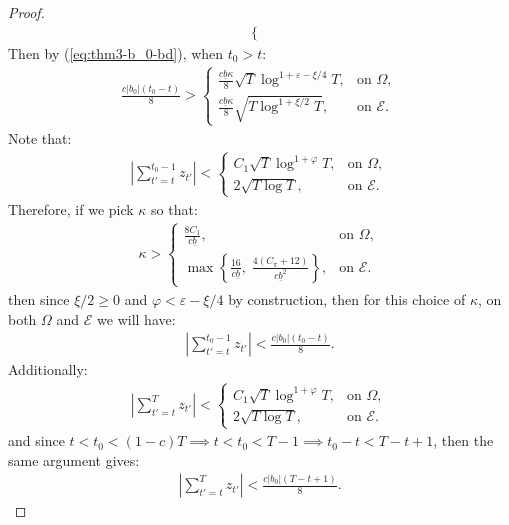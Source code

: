 \begin{proof}
\begin{align*}
\begin{cases}
    \end{cases}
\end{align*}
Then by (\ref{eq:thm3-b_0-bd}), when $t_0 > t$:
\begin{align*}
    \frac{c|b_0|(t_0-t)}{8} > 
    \begin{cases}
        \frac{c\underline{b}\kappa}{8} \sqrt{T}\log^{1+\varepsilon - \xi/4} T, & \text{on } \Omega, \\
        \frac{c\underline{b}\kappa}{8} \sqrt{T\log^{1+\xi/2} T}, & \text{on } \mathcal{E}.
    \end{cases}
\end{align*}
Note that:
\begin{align*}
    \left|\sum_{t'=t}^{t_0-1} z_{t'}\right| < 
    \begin{cases}
        C_1 \sqrt{T}\log^{1+\varphi} T, & \text{on } \Omega, \\
        2 \sqrt{T\log T}, & \text{on } \mathcal{E}.
    \end{cases}
\end{align*}
Therefore, if we pick $\kappa$ so that:
\begin{align*}
   \kappa >  
    \begin{cases}
        \frac{8C_1}{c\underline{b}}, & \text{on } \Omega, \\
        \max\left\{\frac{16}{c\underline{b}},\; \frac{4(C_\pi + 12)}{c\underline{b}^2}\right\}, & \text{on } \mathcal{E}.
    \end{cases}
\end{align*}
then since $\xi / 2 \geq0$ and $\varphi < \varepsilon - \xi/4$ by construction, then for this choice of $\kappa$, on both $\Omega$ and $\mathcal{E}$ we will have: 
\begin{align}
    \left|\sum_{t'=t}^{t_0-1} z_{t'}\right| < \frac{c|b_0|(t_0-t)}{8}. \label{eq:thm3-cs2-bd9}
\end{align}
Additionally:
\begin{align*}
    \left|\sum_{t'=t}^T z_{t'}\right| < 
    \begin{cases}
        C_1 \sqrt{T}\log^{1+\varphi} T, & \text{on } \Omega, \\
        2 \sqrt{T\log T}, & \text{on } \mathcal{E}.
    \end{cases}
\end{align*}
and since $t < t_0 < (1-c)T \implies t < t_0 < T - 1 \implies t_0 - t < T - t + 1$, then the same argument gives:
\begin{align}
    \left|\sum_{t'=t}^T z_{t'}\right| < \frac{c|b_0|(T-t+1)}{8}. \label{eq:thm3-cs2-bd10}

\end{align}
\end{proof}
